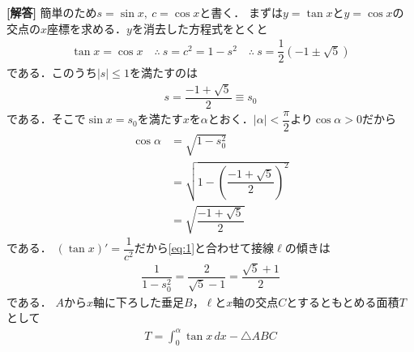 \documentclass[../../main.tex]{subfiles}
\begin{document}
\begin{oframed}
  
\end{oframed}

{\bf [解答]}
簡単のため$s=\sin x,\ c=\cos x$と書く．
まずは$y=\tan x$と$y=\cos x$の交点の$x$座標を求める．$y$を消去した方程式をとくと
\begin{align}
  \tan x=\cos x \quad\therefore\ s=c^2=1-s^2 \quad\therefore\ s=\dfrac{1}{2}(-1\pm\sqrt{5})
\end{align}
である．このうち$|s|\le 1$を満たすのは
\begin{align}
  s=\dfrac{-1+\sqrt{5}}{2}\equiv s_0 \label{eq:1}
\end{align}
である．そこで$\sin x=s_0$を満たす$x$を$\alpha$とおく．$|\alpha|<\dfrac{\pi}{2}$より$\cos\alpha>0$だから
\begin{align}
  \cos\alpha
  &= \sqrt{1-s^2_0} \\
  &= \sqrt{1-\left(\dfrac{-1+\sqrt{5}}{2}\right)^2} \\
  &= \sqrt{\dfrac{-1+\sqrt{5}}{2}} \label{eq:2}
\end{align}
である．
$(\tan x)'=\dfrac{1}{c^2}$だから\cref{eq:1}と合わせて接線$\ell$の傾きは
\begin{align}
  \dfrac{1}{1-s_0^2}=\dfrac{2}{\sqrt{5}-1}=\dfrac{\sqrt{5}+1}{2} \label{eq:3}
\end{align}
である．
$A$から$x$軸に下ろした垂足$B$，$\ell$と$x$軸の交点$C$とするともとめる面積$T$として
\begin{align}
  T=\int_0^\alpha\tan x\,dx-\triangle ABC \label{eq:4}
\end{align}
\end{document}
